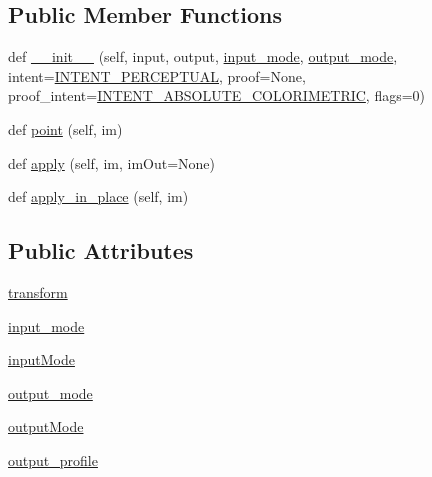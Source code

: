 \subsection*{Public Member Functions}
\begin{DoxyCompactItemize}
\item 
def \hyperlink{classPIL_1_1ImageCms_1_1ImageCmsTransform_ad04e6f752e3f0a18f7ff51bf6fde21df}{\+\_\+\+\_\+init\+\_\+\+\_\+} (self, input, output, \hyperlink{classPIL_1_1ImageCms_1_1ImageCmsTransform_a8af66d68fca7d5e45c2531298ac315cc}{input\+\_\+mode}, \hyperlink{classPIL_1_1ImageCms_1_1ImageCmsTransform_a92891f034069a174f6102603ba815070}{output\+\_\+mode}, intent=\hyperlink{namespacePIL_1_1ImageCms_a5ede11c95f67c7ea71b86e9a9e8a4f87}{I\+N\+T\+E\+N\+T\+\_\+\+P\+E\+R\+C\+E\+P\+T\+U\+AL}, proof=None, proof\+\_\+intent=\hyperlink{namespacePIL_1_1ImageCms_a6704a2c2d4e948b9d74a12a567f68b9e}{I\+N\+T\+E\+N\+T\+\_\+\+A\+B\+S\+O\+L\+U\+T\+E\+\_\+\+C\+O\+L\+O\+R\+I\+M\+E\+T\+R\+IC}, flags=0)
\item 
def \hyperlink{classPIL_1_1ImageCms_1_1ImageCmsTransform_a7f8aea2a92f429d8ff13543fac9a2c6d}{point} (self, im)
\item 
def \hyperlink{classPIL_1_1ImageCms_1_1ImageCmsTransform_afb0530a8a41c646efc878abf047ed8ec}{apply} (self, im, im\+Out=None)
\item 
def \hyperlink{classPIL_1_1ImageCms_1_1ImageCmsTransform_a4154b3d28f53dd121e8c0ce19d9770ee}{apply\+\_\+in\+\_\+place} (self, im)
\end{DoxyCompactItemize}
\subsection*{Public Attributes}
\begin{DoxyCompactItemize}
\item 
\hyperlink{classPIL_1_1ImageCms_1_1ImageCmsTransform_a7466fb90014a81fc50f1f30524639d9d}{transform}
\item 
\hyperlink{classPIL_1_1ImageCms_1_1ImageCmsTransform_a8af66d68fca7d5e45c2531298ac315cc}{input\+\_\+mode}
\item 
\hyperlink{classPIL_1_1ImageCms_1_1ImageCmsTransform_a103995c7e92a731c0acc1b818bdf5df1}{input\+Mode}
\item 
\hyperlink{classPIL_1_1ImageCms_1_1ImageCmsTransform_a92891f034069a174f6102603ba815070}{output\+\_\+mode}
\item 
\hyperlink{classPIL_1_1ImageCms_1_1ImageCmsTransform_a1c5c23b2698d4426afa85f7ceb3bffe9}{output\+Mode}
\item 
\hyperlink{classPIL_1_1ImageCms_1_1ImageCmsTransform_a2fcb26405658b3251cf23242d490b8fb}{output\+\_\+profile}
\end{DoxyCompactItemize}


